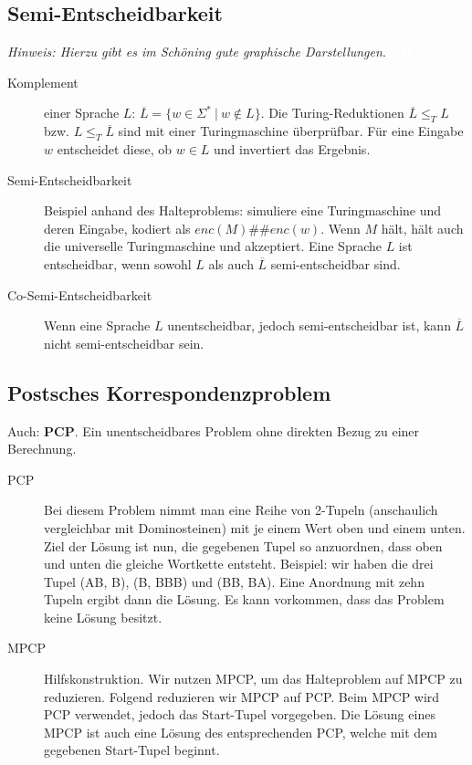 \documentclass[a4paper,10pt]{article}
\newcommand{\vl}[1]{\colorbox{vl}{\textcolor{white}{\small\textbf{#1}}}}
\newcommand{\f}[1]{\textbf{#1}}
\begin{document}
    \subsection{Semi-Entscheidbarkeit}
    \textit{Hinweis: Hierzu gibt es im Schöning gute graphische Darstellungen}. \vl{TIL 5}
    \begin{description}
        \item[Komplement] einer Sprache $L$: $\overline{L} = \{w \in \Sigma^* ~|~ w \notin L \}$. Die Turing-Reduktionen $\overline{L} \leq_T L$ bzw. $L \leq_T \overline{L}$ sind mit einer Turingmaschine überprüfbar. Für eine Eingabe $w$ entscheidet diese, ob $w \in L$ und invertiert das Ergebnis.
        \item[Semi-Entscheidbarkeit] Beispiel anhand des Halteproblems: simuliere eine Turingmaschine und deren Eingabe, kodiert als $enc(M)\#\#enc(w)$. Wenn $M$ hält, hält auch die universelle Turingmaschine und akzeptiert. Eine Sprache $L$ ist entscheidbar, wenn sowohl $L$ als auch $\overline{L}$ semi-entscheidbar sind.
        \item[Co-Semi-Entscheidbarkeit] Wenn eine Sprache $L$ unentscheidbar, jedoch semi-entscheidbar ist, kann $\overline{L}$ nicht semi-entscheidbar sein.
    \end{description}


    \newpage
    \subsection{Postsches Korrespondenzproblem}
    Auch: \f{PCP}. Ein unentscheidbares Problem ohne direkten Bezug zu einer Berechnung. \vl{TIL 5}
    \begin{description}
        \item[PCP] Bei diesem Problem nimmt man eine Reihe von 2-Tupeln (anschaulich vergleichbar mit Dominosteinen) mit je einem Wert oben und einem unten. Ziel der Lösung ist nun, die gegebenen Tupel so anzuordnen, dass oben und unten die gleiche Wortkette entsteht. Beispiel: wir haben die drei Tupel (AB, B), (B, BBB) und (BB, BA). Eine Anordnung mit zehn Tupeln ergibt dann die Lösung. Es kann vorkommen, dass das Problem keine Lösung besitzt.
        \item[MPCP] Hilfskonstruktion. Wir nutzen MPCP, um das Halteproblem auf MPCP zu reduzieren. Folgend reduzieren wir MPCP auf PCP. Beim MPCP wird PCP verwendet, jedoch das Start-Tupel vorgegeben. Die Lösung eines MPCP ist auch eine Lösung des entsprechenden PCP, welche mit dem gegebenen Start-Tupel beginnt.
    \end{description}
\end{document}
